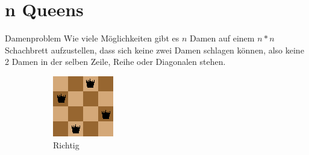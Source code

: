 \documentclass[aspectratio=43,t]{beamer}
\begin{document}
  \section{n Queens}
    \begin{frame}{Damenproblem}
      Wie viele Möglichkeiten gibt es $n$ Damen auf einem $n * n$ Schachbrett aufzustellen, dass sich keine zwei Damen schlagen können, 
      also keine 2 Damen in der selben Zeile, Reihe oder Diagonalen stehen.
      \begin{figure}[h!]
        \centering
        \begin{subfigure}{0.4\linewidth}
          \includegraphics[width=\linewidth]{../img/queensRight.png}
          \caption{Richtig}
        \end{subfigure}
        \begin{subfigure}{0.4\linewidth}

\end{subfigure}
\end{figure}
\end{frame}
\end{document}
